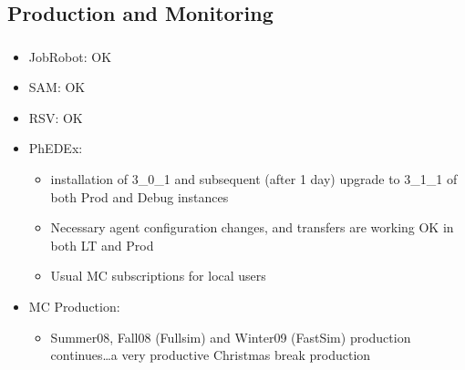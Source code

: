 \documentclass{beamer}
\begin{document}
\subsection{Production and Monitoring}
\begin{frame}
\frametitle{}
\begin{itemize}
     \item JobRobot: OK
     \item SAM: OK
     \item RSV: OK
     \item PhEDEx:
     \begin{itemize}
        \item installation of 3\_0\_1 and subsequent (after 1 day) upgrade to 3\_1\_1 of both Prod and Debug instances
        \item Necessary agent configuration changes, and transfers are working OK in both LT and Prod
        \item Usual MC subscriptions for local users
     \end{itemize}
     \item MC Production:
     \begin{itemize}
        \item Summer08, Fall08 (Fullsim) and Winter09 (FastSim) production continues\ldots{}a very productive Christmas break production
     \end{itemize}
\end{itemize}
\end{frame}
\end{document}
